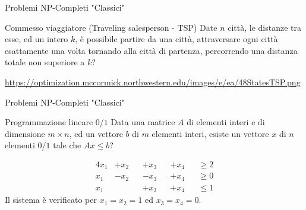 \begin{frame}{Problemi NP-Completi "Classici"}
	
\vspace{-9pt}
\begin{block}{Commesso viaggiatore (Traveling salesperson - TSP)}
Date $n$ città, le distanze tra esse, ed un intero $k$, è possibile partire da
una città, attraversare ogni città esattamente una volta tornando alla città
di partenza, percorrendo una distanza totale non superiore a $k$?
\end{block}

\begin{center}
\end{center}

\vfill
\tiny
\url{https://optimization.mccormick.northwestern.edu/images/e/ea/48StatesTSP.png}

\end{frame}


\begin{frame}{Problemi NP-Completi "Classici"}
	
\vspace{-9pt}
\begin{block}{Programmazione lineare $0$/$1$}
Data una matrice $A$ di elementi interi e di dimensione $m \times n$, ed un
vettore $b$ di $m$ elementi interi, esiste un vettore $x$ di $n$ elementi $0$/$1$ tale che $Ax \le b$?
\end{block}

\bigskip
{}
\begin{alignat*}{4}
x_1 &+ x_2 &&+ x_3 &&+ x_4 &&\ge 2\\
x_1 &- x_2 &&- x_3 &&+ x_4 &&\ge 0\\
x_1 &&&+ x_3 &&+ x_4 &&\le 1
\end{alignat*}
Il sistema è verificato per $x_1 = x_2 = 1$ ed $x_3 = x_4 = 0$.

\end{frame}


